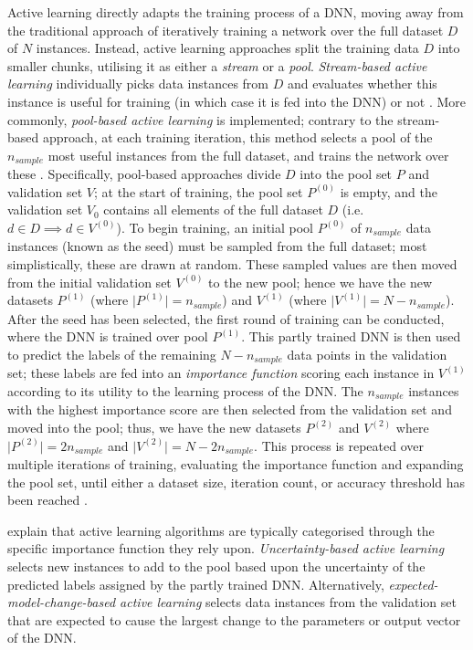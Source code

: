 \documentclass[a4paper, 11pt]{report}
\begin{document}
    Active learning directly adapts the training process of a DNN, moving away from the traditional approach of iteratively training a network over the full dataset $D$ of $N$ instances. Instead, active learning approaches split the training data $D$ into smaller chunks, utilising it as either a \emph{stream} or a \emph{pool}. \emph{Stream-based active learning} individually picks data instances from $D$ and evaluates whether this instance is useful for training (in which case it is fed into the DNN) or not \citep{ren-2021}. More commonly, \emph{pool-based active learning} is implemented; contrary to the stream-based approach, at each training iteration, this method selects a pool of the $n_{sample}$ most useful instances from the full dataset, and trains the network over these \citep{ren-2021}. Specifically, pool-based approaches divide $D$ into the pool set $P$ and validation set $V$; at the start of training, the pool set $P^{(0)}$ is empty, and the validation set $V_0$ contains all elements of the full dataset $D$ (i.e. $d \in D \implies d \in V^{(0)}$). To begin training, an initial pool $P^{(0)}$ of $n_{sample}$ data instances (known as the seed) must be sampled from the full dataset; most simplistically, these are drawn at random. These sampled values are then moved from the initial validation set $V^{(0)}$ to the new pool; hence we have the new datasets $P^{(1)}$ (where $\vert P^{(1)} \vert = n_{sample}$) and $V^{(1)}$ (where $\vert V^{(1)} \vert = N - n_{sample}$). After the seed has been selected, the first round of training can be conducted, where the DNN is trained over pool $P^{(1)}$. This partly trained DNN is then used to predict the labels of the remaining $N - n_{sample}$ data points in the validation set; these labels are fed into an \emph{importance function} scoring each instance in $V^{(1)}$ according to its utility to the learning process of the DNN. The $n_{sample}$ instances with the highest importance score are then selected from the validation set and moved into the pool; thus, we have the new datasets $P^{(2)}$ and $V^{(2)}$ where $\vert P^{(2)} \vert = 2 n_{sample}$ and $\vert V^{(2)} \vert = N - 2 n_{sample}$. This process is repeated over multiple iterations of training, evaluating the importance function and expanding the pool set, until either a dataset size, iteration count, or accuracy threshold has been reached \citep{ren-2021}. 

    \citet{xu-2021} explain that active learning algorithms are typically categorised through the specific importance function they rely upon. \emph{Uncertainty-based active learning} selects new instances to add to the pool based upon the uncertainty of the predicted labels assigned by the partly trained DNN. Alternatively, \emph{expected-model-change-based active learning} selects data instances from the validation set that are expected to cause the largest change to the parameters or output vector of the DNN. 
\end{document}
